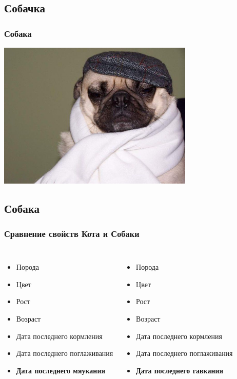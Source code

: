 \documentclass[compress,red]{beamer}
\begin{document}
\subsection{Собачка}
\begin{frame}[fragile]
  \frametitle{Собака}
  \centerline{\includegraphics[width=0.7\textwidth]{images/dog.jpg}}
\end{frame}

\subsection{Собака}
\begin{frame}[fragile]
  \frametitle{Сравнение свойств Кота и Собаки}
  \begin{columns}[ll]
    \column{2.0in}
      \begin{itemize}
        \item Порода
        \item Цвет
        \item Рост
        \item Возраст
        \item Дата последнего кормления
        \item Дата последнего поглаживания
        \item \textbf{Дата последнего мяукания}      
      \end{itemize}
    \column{2.0in}
      \begin{itemize}
        \item Порода
        \item Цвет
        \item Рост
        \item Возраст
        \item Дата последнего кормления
        \item Дата последнего поглаживания
        \item \textbf{Дата последнего гавкания}      
      \end{itemize}
  \end{columns}
\end{frame}
\end{document}
